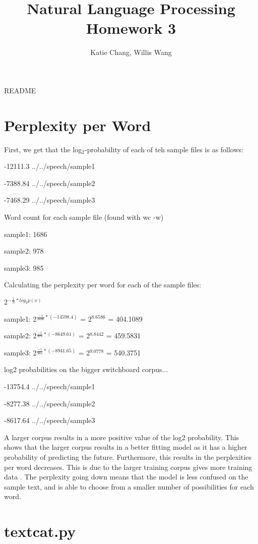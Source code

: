\documentclass[12pt, letterpaper]{article}
\title{Natural Language Processing Homework 3}
\author{Katie Chang, Willis Wang}
\begin{document}
\maketitle

README

\section{Perplexity per Word}
First, we get that the log$_{2}$-probability of each of teh sample files is as follows:

-12111.3	../../speech/sample1

-7388.84	../../speech/sample2

-7468.29	../../speech/sample3

Word count for each sample file (found with wc -w)

sample1: 1686

sample2: 978
     
sample3: 985

Calculating the perplexity per word for each of the sample files:

2$^{-\frac{1}{N}*log_{2}p(x)}$

sample1: 2$^{\frac{-1}{1686} * (-14598.4)}$ = 2$^{8.6586}$ = 404.1089

sample2: 2$^{\frac{-1}{978} * (-8649.61)}$ = 2$^{8.8442}$ = 459.5831

sample3: 2$^{\frac{-1}{985} * (-8941.65)}$ = 2$^{9.0778}$ = 540.3751

log2 probabilities on the bigger switchboard corpus...

-13754.4	../../speech/sample1

-8277.38	../../speech/sample2

-8617.64	../../speech/sample3

A larger corpus results in a more positive value of the log2 probability. This shows that the larger corpus results in a better fitting model as it has a higher probability of predicting the future. Furthermore, this results in the perplexities per word decreases. This is due to the larger training corpus gives more training data . The perplexity going down means that the model is less confused on the sample text, and is able to choose from a smaller number of possibilities for each word.

\section{textcat.py}
\end{document}
